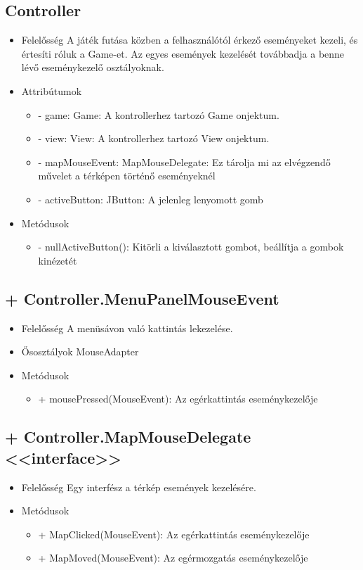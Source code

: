 \subsection{Controller}
\begin{itemize}
\item Felelősség \newline
A játék futása közben a felhasználótól érkező eseményeket kezeli, és értesíti róluk a Game-et. Az egyes események kezelését továbbadja a benne lévő eseménykezelő osztályoknak.
\item Attribútumok
	\begin{itemize}
		\item - game: Game: A kontrollerhez tartozó Game onjektum.
		\item - view: View: A kontrollerhez tartozó View onjektum.
		\item - mapMouseEvent: MapMouseDelegate: Ez tárolja mi az elvégzendő művelet a térképen történő eseményeknél
		\item - activeButton: JButton: A jelenleg lenyomott gomb
	\end{itemize}
\item Metódusok
	\begin{itemize}
		\item - nullActiveButton(): Kitörli a kiválasztott gombot, beállítja a gombok kinézetét
	\end{itemize}
\end{itemize}

\subsection{+ Controller.MenuPanelMouseEvent}
\begin{itemize}
\item Felelősség \newline
A menüsávon való kattintás lekezelése.
\item Ősosztályok\newline
MouseAdapter
\item Metódusok
	\begin{itemize}
		\item + mousePressed(MouseEvent): Az egérkattintás eseménykezelője
	\end{itemize}
\end{itemize}

\subsection{+ Controller.MapMouseDelegate <<interface>>}
\begin{itemize}
\item Felelősség \newline
Egy interfész a térkép események kezelésére.
\item Metódusok
	\begin{itemize}
		\item + MapClicked(MouseEvent): Az egérkattintás eseménykezelője
		\item + MapMoved(MouseEvent): Az egérmozgatás eseménykezelője
	\end{itemize}
\end{itemize}

